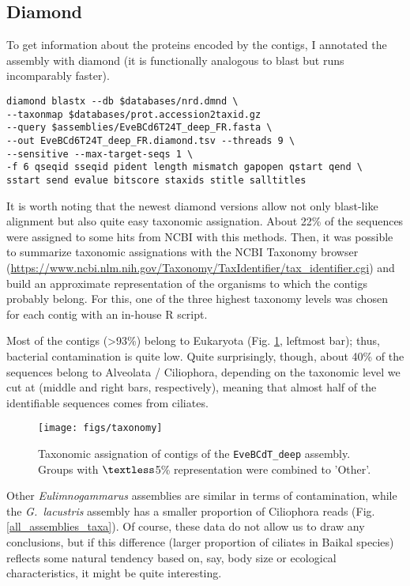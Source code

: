\documentclass[12pt]{article}
\begin{document}
\subsection{Diamond}

To get information about the proteins encoded by the contigs, I annotated the assembly with diamond (it is functionally analogous to blast but runs incomparably faster). 

\begin{verbatim}
diamond blastx --db $databases/nrd.dmnd \
--taxonmap $databases/prot.accession2taxid.gz 
--query $assemblies/EveBCd6T24T_deep_FR.fasta \
--out EveBCd6T24T_deep_FR.diamond.tsv --threads 9 \ 
--sensitive --max-target-seqs 1 \
-f 6 qseqid sseqid pident length mismatch gapopen qstart qend \
sstart send evalue bitscore staxids stitle salltitles
\end{verbatim}

It is worth noting that the newest diamond versions allow not only blast-like alignment but also quite easy taxonomic assignation. About 22\% of the sequences were assigned to some hits from NCBI with this methods. Then, it was possible to summarize taxonomic assignations with the NCBI Taxonomy browser (\url{https://www.ncbi.nlm.nih.gov/Taxonomy/TaxIdentifier/tax_identifier.cgi}) and build an approximate representation of the organisms to which the contigs probably belong. For this, one of the three highest taxonomy levels was chosen for each contig with an in-house R script. 

Most of the contigs (\textgreater93\%) belong to Eukaryota (Fig. \ref{taxonomy}, leftmost bar); thus, bacterial contamination is quite low. Quite surprisingly, though, about 40\% of the sequences belong to Alveolata / Ciliophora, depending on the taxonomic level we cut at (middle and right bars, respectively), meaning that almost half of the identifiable sequences comes from ciliates. 


\begin{figure}[H]
\texttt{[image: figs/taxonomy]}
\caption{Taxonomic assignation of contigs of the \texttt{EveBCdT\_deep} assembly. Groups with $\textless$5\% representation were combined to 'Other'.}
\label{taxonomy}
\end{figure}

Other \textit{Eulimnogammarus} assemblies are similar in terms of contamination, while the \textit{G.~lacustris} assembly has a smaller proportion of Ciliophora reads (Fig. \ref{all_assemblies_taxa}). Of course, these data do not allow us to draw any conclusions, but if this difference (larger proportion of ciliates in Baikal species) reflects some natural tendency based on, say, body size or ecological characteristics, it might be quite interesting. 
\end{document}
